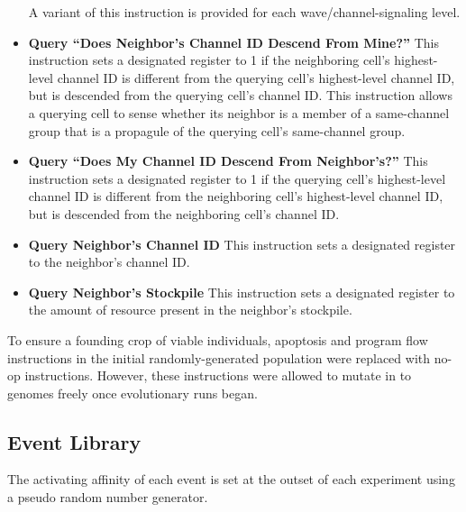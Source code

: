\begin{itemize}
A variant of this instruction is provided for each wave/channel-signaling level.
\item \textbf{Query ``Does Neighbor's Channel ID Descend From Mine?''}
This instruction sets a designated register to 1 if the neighboring cell's highest-level channel ID is different from the querying cell's highest-level channel ID, but is descended from the querying cell's channel ID.
This instruction allows a querying cell to sense whether its neighbor is a member of a same-channel group that is a propagule of the querying cell's same-channel group.
\item \textbf{Query ``Does My Channel ID Descend From Neighbor's?''}
This instruction sets a designated register to 1 if the querying cell's highest-level channel ID is different from the neighboring cell's highest-level channel ID, but is descended from the neighboring cell's channel ID.
\item \textbf{Query Neighbor's Channel ID}
This instruction sets a designated register to the neighbor's channel ID.
\item \textbf{Query Neighbor's Stockpile}
This instruction sets a designated register to the amount of resource present in the neighbor's stockpile.
\end{itemize}

To ensure a founding crop of viable individuals, apoptosis and program flow instructions in the initial randomly-generated population were replaced with no-op instructions.
However, these instructions were allowed to mutate in to genomes freely once evolutionary runs began.

\subsection{Event Library}

The activating affinity of each event is set at the outset of each experiment using a pseudo random number generator.

